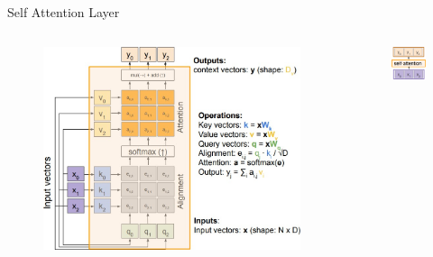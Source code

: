 \begin{frame}[allowframebreaks]{Self Attention Layer}
    \begin{columns}
    \begin{column}{0.7\textwidth}
        \begin{figure}
            \flushleft
            \includegraphics[width=\linewidth,height=\textheight,keepaspectratio]{images/transformers/slide_43_1_img.jpg}
        \end{figure}
    \end{column}
    \begin{column}{0.4\textwidth}
        \begin{figure}
            \centering
            \includegraphics[width=0.8\linewidth,height=\textheight,keepaspectratio]{images/transformers/slide_43_2_img.png}
        \end{figure}
    \end{column}
    \end{columns}
\end{frame}


